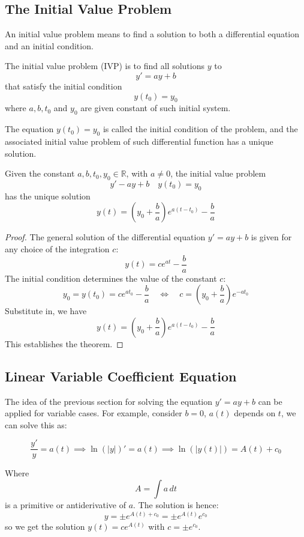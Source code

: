 \subsection{The Initial Value Problem}
An initial value problem means to find a solution to both a differential equation and an initial condition. 
\begin{definition}[IVP]
    The initial value problem (IVP) is to find all solutions $y$ to $$y'=ay+b$$ that satisfy the initial condition $$y(t_{0})=y_{0}$$ where $a,b,t_{0}$ and $y_{0}$ are given constant of such initial system. 
\end{definition}
The equation $y(t_{0})=y_{0}$ is called the initial condition of the problem, and the associated initial value problem of such differential function has a unique solution.
\begin{theorem}
    Given the constant $a,b,t_{0},y_{0}\in\mathbb{R}$, with $a\neq 0$, the initial value problem $$y'-ay+b\quad y(t_{0})=y_{0}$$ has the unique solution $$y(t)=\left( y_{0}+\frac{b}{a} \right)e^{a(t-t_{0})}-\frac{b}{a}$$
\end{theorem}

\begin{proof}
    The general solution of the differential equation $y'=ay+b$ is given for any choice of the integration $c$: 
$$y(t)=ce^{at}-\frac{b}{a}$$
The initial condition determines the value of the constant $c$: $$y_{0}=y(t_{0})=ce^{at_{0}}-\frac{b}{a}\quad \iff \quad c=\left( y_{0}+\frac{b}{a} \right)e^{-at_{0}}$$
Substitute in, we have $$y(t)=\left( y_{0}+\frac{b}{a} \right)e^{a(t-t_{0})}-\frac{b}{a}$$
This establishes the theorem.
\end{proof}

\subsection{Linear Variable Coefficient Equation}

The idea of the previous section for solving the equation $y'=ay+b$ can be applied for variable cases. For example, consider $b=0$, $a(t)$ depends on $t$, we can solve this as:

\begin{equation}
    \frac{y'}{y}=a(t)\implies \ln{(\lvert y \rvert )}'=a(t)\implies \ln{(\lvert y(t) \rvert )}=A(t)+c_{0}
\end{equation}

Where $$A=\int a \, dt $$ is a primitive or antiderivative of $a$. 
The solution is hence: 
$$y=\pm e^{A(t)+c_{0}}=\pm e^{A(t)}e^{c_{0}}$$ so we get the solution $y(t)=ce^{A(t)}$ with $c=\pm e^{c_{0}}$. 

